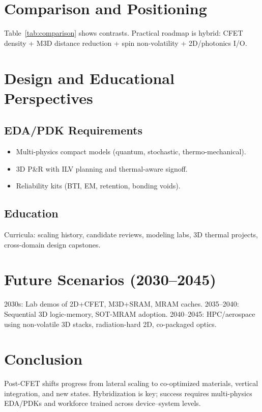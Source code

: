 \documentclass[conference]{IEEEtran}
\begin{document}
\section{Comparison and Positioning}
Table~\ref{tab:comparison} shows contrasts.  
Practical roadmap is hybrid: CFET density + M3D distance reduction + spin non-volatility + 2D/photonics I/O.

\section{Design and Educational Perspectives}
\subsection{EDA/PDK Requirements}
\begin{itemize}
  \item Multi-physics compact models (quantum, stochastic, thermo-mechanical).
  \item 3D P\&R with ILV planning and thermal-aware signoff.
  \item Reliability kits (BTI, EM, retention, bonding voids).
\end{itemize}

\subsection{Education}
Curricula: scaling history, candidate reviews, modeling labs, 3D thermal projects, cross-domain design capstones.

\section{Future Scenarios (2030--2045)}
2030s: Lab demos of 2D+CFET, M3D+SRAM, MRAM caches.  
2035–2040: Sequential 3D logic-memory, SOT-MRAM adoption.  
2040–2045: HPC/aerospace using non-volatile 3D stacks, radiation-hard 2D, co-packaged optics.

\section{Conclusion}
Post-CFET shifts progress from lateral scaling to co-optimized materials, vertical integration, and new states.
Hybridization is key; success requires multi-physics EDA/PDKs and workforce trained across device–system levels.
\end{document}
